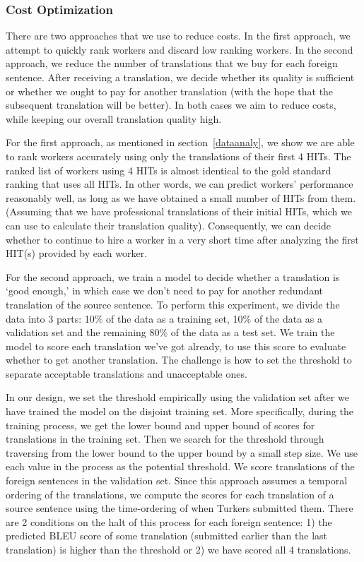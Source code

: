\documentclass[11pt]{article}
\begin{document}
 \subsubsection{Cost Optimization}
There are two approaches that we use to reduce costs. In the first approach, we attempt to quickly rank workers and discard low ranking workers. In the second approach, we reduce the number of translations that we buy for each foreign sentence. After receiving a translation, we decide whether its quality is sufficient or whether we ought to pay for another translation (with the hope that the subsequent translation will be better).  In both cases we aim to reduce costs, while keeping our overall translation quality high.
 
 For the first approach, as mentioned in section~\ref{dataanaly}, we show we are able to rank workers accurately using only the translations of their first 4 HITs.  The ranked list of workers using 4 HITs is  almost identical to the gold standard ranking that uses all HITs. In other words, we can predict workers' performance reasonably well, as long as we have obtained a small number of HITs from them.  (Assuming that we have professional translations of their initial HITs, which we can use to calculate their translation quality). Consequently, we can decide whether to continue to hire a worker in a very short time after analyzing the first HIT(s) provided by each worker.
 
 For the second approach,  we train a model to decide whether a translation  is `good enough,' in which case we don't need to  pay for another redundant translation of the source sentence.  To perform this experiment, we divide the data into 3 parts: 10$\%$ of the data as a training set, 10$\%$ of the data as a validation set and the remaining 80$\%$ of the data as a test set. We train the model to score each translation we've got already, to use this score to evaluate whether to get another translation. The challenge is how to set the threshold to separate acceptable translations and unacceptable ones. 
 
 
 In our design, we set the threshold empirically using the validation set after we have trained the model on the disjoint training set. More specifically, during the training process, we get the lower bound and upper bound of scores for translations in the training set. Then we search for the threshold through traversing from the lower bound to the upper bound by a small step size. %
 We use each value  in the process  as the potential threshold.  We score translations of the foreign sentences in the validation set.  Since this approach assumes a temporal ordering of the translations, we compute the scores for each translation of a source sentence using the time-ordering of when Turkers submitted them. There are 2 conditions on the halt of this process for each foreign sentence: 1) the predicted BLEU score of some translation (submitted earlier than the last translation) is higher than the threshold or 2) we have scored all 4 translations.  
\end{document}
